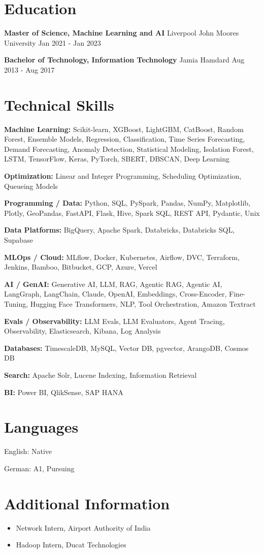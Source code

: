 \documentclass[10pt,a4paper]{article}
\begin{document}
\section{Education}
\textbf{Master of Science, Machine Learning and AI} \textbar{} Liverpool John Moores University \hfill Jan 2021 - Jan 2023\par
\textbf{Bachelor of Technology, Information Technology} \textbar{} Jamia Hamdard \hfill Aug 2013 - Aug 2017\par

\section{Technical Skills}
\textbf{Machine Learning:} Scikit-learn, XGBoost, LightGBM, CatBoost, Random Forest, Ensemble Models, Regression, Classification, Time Series Forecasting, Demand Forecasting, Anomaly Detection, Statistical Modeling, Isolation Forest, LSTM, TensorFlow, Keras, PyTorch, SBERT, DBSCAN, Deep Learning\par
\textbf{Optimization:} Linear and Integer Programming, Scheduling Optimization, Queueing Models\par
\textbf{Programming / Data:} Python, SQL, PySpark, Pandas, NumPy, Matplotlib, Plotly, GeoPandas, FastAPI, Flask, Hive, Spark SQL, REST API, Pydantic, Unix\par
\textbf{Data Platforms:} BigQuery, Apache Spark, Databricks, Databricks SQL, Supabase\par
\textbf{MLOps / Cloud:} MLflow, Docker, Kubernetes, Airflow, DVC, Terraform, Jenkins, Bamboo, Bitbucket, GCP, Azure, Vercel\par
\textbf{AI / GenAI:} Generative AI, LLM, RAG, Agentic RAG, Agentic AI, LangGraph, LangChain, Claude, OpenAI, Embeddings, Cross-Encoder, Fine-Tuning, Hugging Face Transformers, NLP, Tool Orchestration, Amazon Textract\par
\textbf{Evals / Observability:} LLM Evals, LLM Evaluators, Agent Tracing, Observability, Elasticsearch, Kibana, Log Analysis\par
\textbf{Databases:} TimescaleDB, MySQL, Vector DB, pgvector, ArangoDB, Cosmos DB\par
\textbf{Search:} Apache Solr, Lucene Indexing, Information Retrieval\par
\textbf{BI:} Power BI, QlikSense, SAP HANA\par

\section{Languages}
English: Native\par
German: A1, Pursuing\par

\section{Additional Information}
\begin{itemize}
  \item Network Intern, Airport Authority of India
  \item Hadoop Intern, Ducat Technologies
\end{itemize}
\end{document}
